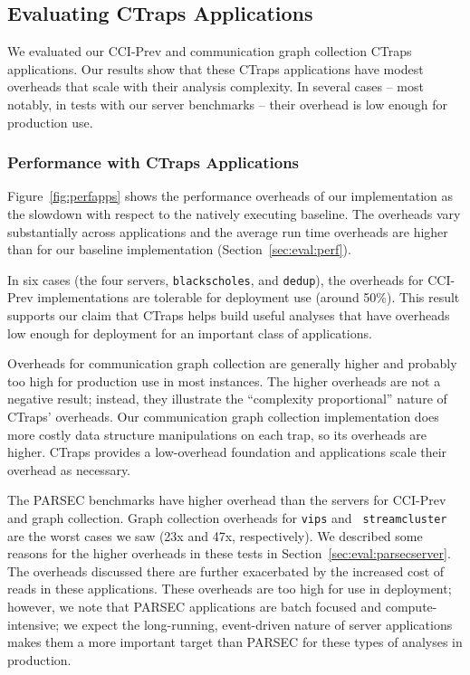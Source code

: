 \documentclass[preprint,10pt]{sigplanconf}
\newcommand{\ctraps}{CTraps\xspace}
\newcommand{\ctrapsmm}{CTraps-NRR\xspace}
\begin{document}
\subsection{Evaluating CTraps Applications}
\label{sec:appperf}
We evaluated our CCI-Prev and communication graph collection CTraps
applications.  Our results show that these CTraps applications have modest
overheads that scale with their analysis complexity.  In several cases -- most
notably, in tests with our server benchmarks -- their overhead is low enough
for production use.  

\subsubsection{Performance with \ctraps Applications}

 Figure~\ref{fig:perfapps} shows the performance overheads of
our implementation as the slowdown with respect to the natively executing
baseline.  The overheads vary substantially across applications and the average
run time overheads are higher than for our baseline implementation
(Section~\ref{sec:eval:perf}). 
  

In six cases (the four servers, {\tt blackscholes}, and {\tt dedup}), the overheads
for CCI-Prev implementations are tolerable for deployment use (around 50\%).
This result supports our claim that \ctraps helps build useful analyses that
have overheads low enough for deployment for an important class of
applications.  

Overheads for communication graph collection are generally higher and probably
too high for production use in most instances.  The higher overheads are not a
negative result; instead, they illustrate the ``complexity proportional''
nature of \ctraps' overheads.  Our communication graph collection
implementation does more costly data structure manipulations on each trap, so
its overheads are higher.  \ctraps provides a low-overhead foundation and
applications scale their overhead as necessary. 



The PARSEC benchmarks have higher overhead than the servers for CCI-Prev and
graph collection.  Graph collection overheads for {\tt vips} and {\tt
streamcluster} are the worst cases we saw (23x and 47x, respectively).  We
described some reasons for the higher overheads in these tests in
Section~\ref{sec:eval:parsecserver}.  The overheads discussed there are further
exacerbated by the increased cost of reads in these applications.  These
overheads are too high for use in deployment;  however, we note that PARSEC
applications are batch focused and compute-intensive; we expect the
long-running, event-driven nature of server applications makes them a more
important target than PARSEC for these types of analyses in production.  
\end{document}
